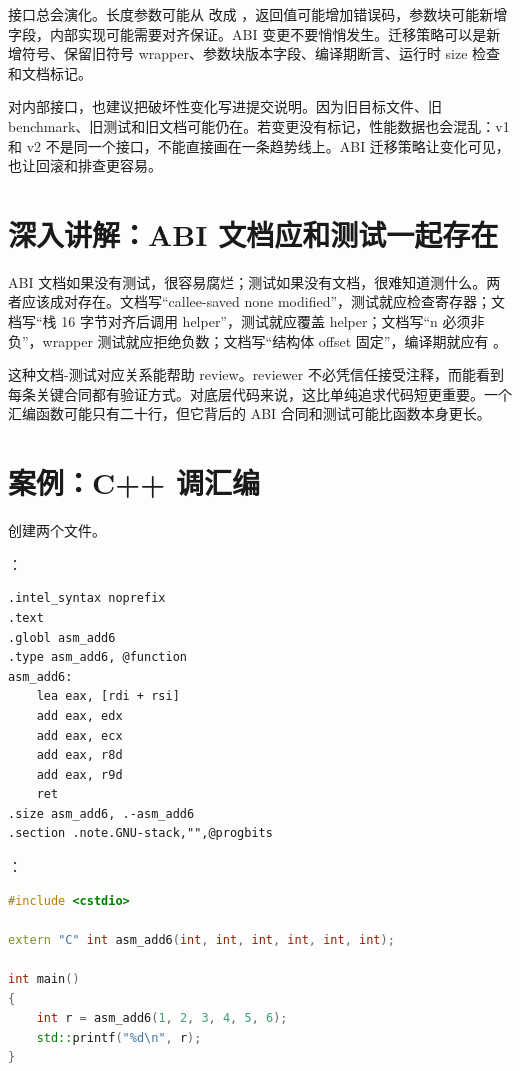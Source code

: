 接口总会演化。长度参数可能从  改成 ，返回值可能增加错误码，参数块可能新增字段，内部实现可能需要对齐保证。ABI 变更不要悄悄发生。迁移策略可以是新增符号、保留旧符号 wrapper、参数块版本字段、编译期断言、运行时 size 检查和文档标记。

对内部接口，也建议把破坏性变化写进提交说明。因为旧目标文件、旧 benchmark、旧测试和旧文档可能仍在。若变更没有标记，性能数据也会混乱：v1 和 v2 不是同一个接口，不能直接画在一条趋势线上。ABI 迁移策略让变化可见，也让回滚和排查更容易。

\section{深入讲解：ABI 文档应和测试一起存在}

ABI 文档如果没有测试，很容易腐烂；测试如果没有文档，很难知道测什么。两者应该成对存在。文档写“callee-saved none modified”，测试就应检查寄存器；文档写“栈 16 字节对齐后调用 helper”，测试就应覆盖 helper；文档写“n 必须非负”，wrapper 测试就应拒绝负数；文档写“结构体 offset 固定”，编译期就应有 。

这种文档-测试对应关系能帮助 review。reviewer 不必凭信任接受注释，而能看到每条关键合同都有验证方式。对底层代码来说，这比单纯追求代码短更重要。一个汇编函数可能只有二十行，但它背后的 ABI 合同和测试可能比函数本身更长。

\section{案例：C++ 调汇编}

创建两个文件。

：

\begin{lstlisting}
.intel_syntax noprefix
.text
.globl asm_add6
.type asm_add6, @function
asm_add6:
    lea eax, [rdi + rsi]
    add eax, edx
    add eax, ecx
    add eax, r8d
    add eax, r9d
    ret
.size asm_add6, .-asm_add6
.section .note.GNU-stack,"",@progbits
\end{lstlisting}

：

\begin{lstlisting}[language=C++]
#include <cstdio>

extern "C" int asm_add6(int, int, int, int, int, int);

int main()
{
    int r = asm_add6(1, 2, 3, 4, 5, 6);
    std::printf("%d\n", r);
}
\end{lstlisting}

